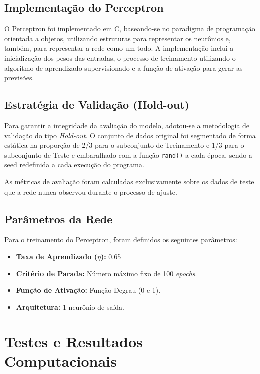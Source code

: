 \documentclass[conference]{IEEEtran}
\begin{document}
		\subsection{Implementação do Perceptron}

			O Perceptron foi implementado em C, baseando-se no paradigma de programação orientada a objetos, utilizando estruturas para representar os neurônios e, também, para representar a rede como um todo. A implementação inclui a inicialização dos pesos das entradas, o processo de treinamento utilizando o algoritmo de aprendizado supervisionado e a função de ativação para gerar as previsões.

		\subsection{Estratégia de Validação (Hold-out)}

			Para garantir a integridade da avaliação do modelo, adotou-se a metodologia de validação do tipo \textit{Hold-out}. O conjunto de dados original foi segmentado de forma estática na proporção de 2/3 para o subconjunto de Treinamento e 1/3 para o subconjunto de Teste e embaralhado com a função \texttt{rand()} a cada época, sendo a seed redefinida a cada execução do programa. 

			As métricas de avaliação foram calculadas exclusivamente sobre os dados de teste que a rede nunca observou durante o processo de ajuste.

		\subsection{Parâmetros da Rede}

			Para o treinamento do Perceptron, foram definidos os seguintes parâmetros:

			\begin{itemize}
				\item \textbf{Taxa de Aprendizado ($\eta$):} 0.65
				\item \textbf{Critério de Parada:} Número máximo fixo de 100 \textit{epochs}.
				\item \textbf{Função de Ativação:} Função Degrau (0 e 1).
				\item \textbf{Arquitetura:} 1 neurônio de saída.
			\end{itemize}

	\section{Testes e Resultados Computacionais}
\end{document}
